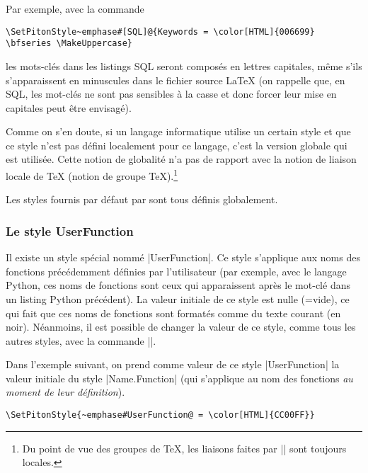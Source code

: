 \documentclass[dvipsnames,svgnames]{article}
\begin{document}
\medskip
Par exemple, avec la commande 
\begin{Verbatim}
\SetPitonStyle~emphase#[SQL]@{Keywords = \color[HTML]{006699} \bfseries \MakeUppercase}
\end{Verbatim}
les mots-clés dans les listings SQL seront composés en lettres capitales, même s'ils s'apparaissent en minuscules
dans le fichier source LaTeX (on rappelle que, en SQL, les mot-clés ne sont pas sensibles à la casse et donc forcer
leur mise en capitales peut être envisagé).

\medskip
Comme on s'en doute, si un langage informatique utilise un certain style et que ce style n'est pas défini
localement pour ce langage, c'est la version globale qui est utilisée. Cette notion de globalité n'a pas de
rapport avec la notion de liaison locale de TeX (notion de groupe TeX).\footnote{Du point de vue des groupes de
  TeX, les liaisons faites par |\SetPitonStyle| sont toujours locales.}

\medskip
Les styles fournis par défaut par  sont tous définis globalement.

\bigskip
\subsubsection{Le style UserFunction}


\bigskip
Il existe un style spécial nommé |UserFunction|. Ce style s'applique aux noms des fonctions précédemment définies
par l'utilisateur (par exemple, avec le langage Python, ces noms de fonctions sont ceux qui apparaissent après le
mot-clé  dans un listing Python précédent). La valeur initiale de ce style est nulle (=vide), ce qui
fait que ces noms de fonctions sont formatés comme du texte courant (en noir). Néanmoins, il est possible de
changer la valeur de ce style, comme tous les autres styles, avec la commande |\SetPitonStyle|.


\medskip
Dans l'exemple suivant, on prend comme valeur de ce style |UserFunction| la valeur initiale du style
|Name.Function| (qui s'applique au nom des fonctions \emph{au moment de leur définition}).

\begingroup

\begin{Verbatim}
\SetPitonStyle{~emphase#UserFunction@ = \color[HTML]{CC00FF}}
\end{Verbatim}

\end{document}
